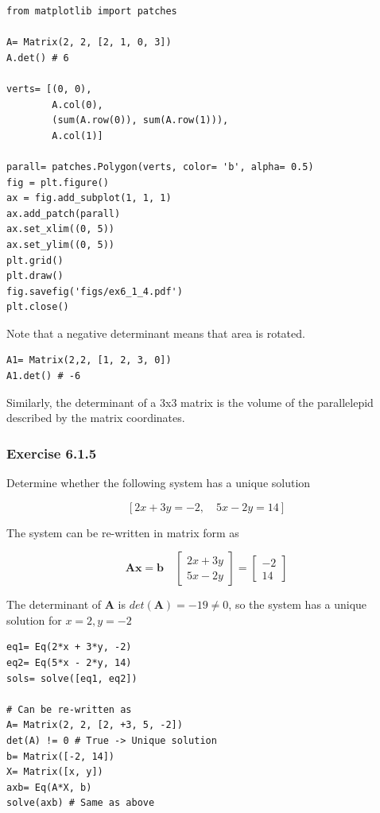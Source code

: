 \begin{verbatim}
from matplotlib import patches

A= Matrix(2, 2, [2, 1, 0, 3])
A.det() # 6

verts= [(0, 0),
        A.col(0),
        (sum(A.row(0)), sum(A.row(1))),
        A.col(1)]

parall= patches.Polygon(verts, color= 'b', alpha= 0.5)
fig = plt.figure()
ax = fig.add_subplot(1, 1, 1)
ax.add_patch(parall)
ax.set_xlim((0, 5))
ax.set_ylim((0, 5))
plt.grid()
plt.draw()
fig.savefig('figs/ex6_1_4.pdf')
plt.close()
\end{verbatim}

Note that a negative determinant means that area is rotated.

\begin{verbatim}
A1= Matrix(2,2, [1, 2, 3, 0])
A1.det() # -6
\end{verbatim}

Similarly, the determinant of a 3x3 matrix is the volume of the parallelepid described
by the matrix coordinates.

\subsubsection{Exercise 6.1.5}

Determine whether the following system has a unique solution

$$
\left [
2 x + 3 y = -2, \quad
5 x - 2 y = 14
\right ]
$$

The system can be re-written in matrix form as

$$
\mathbf{Ax= b} \quad
\left[\begin{matrix}
2 x + 3 y\\5 x - 2 y
\end{matrix}\right] = \left[\begin{matrix}-2\\14\end{matrix}\right]
$$

The determinant of \textbf{A} is $det(\mathbf{A})= -19 \neq 0$, so the system has
a unique solution for $x= 2, y= -2$

\begin{verbatim}
eq1= Eq(2*x + 3*y, -2)
eq2= Eq(5*x - 2*y, 14)
sols= solve([eq1, eq2])

# Can be re-written as 
A= Matrix(2, 2, [2, +3, 5, -2])
det(A) != 0 # True -> Unique solution
b= Matrix([-2, 14])
X= Matrix([x, y])
axb= Eq(A*X, b)
solve(axb) # Same as above
\end{verbatim}

